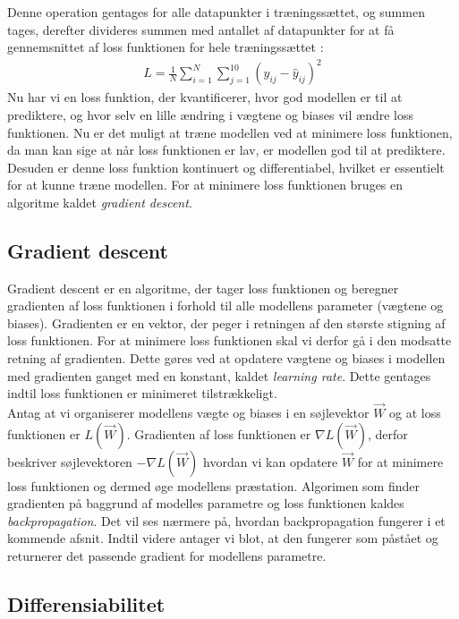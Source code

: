 \documentclass{article}
\begin{document}
Denne operation gentages for alle datapunkter i træningssættet, og summen tages, derefter divideres summen med antallet af datapunkter for at få gennemsnittet af loss funktionen for hele træningssættet \parencite{Sanderson_2017}:
\begin{align}
  L = \frac{1}{N} \sum_{i=1}^{N} \sum_{j=1}^{10} (y_{ij} - \hat{y}_{ij})^2
\end{align}
Nu har vi en loss funktion, der kvantificerer, hvor god modellen er til at prediktere, og hvor selv en lille ændring i vægtene og biases vil ændre loss funktionen. Nu er det muligt at træne modellen ved at minimere loss funktionen, da man kan sige at når loss funktionen er lav, er modellen god til at prediktere. Desuden er denne loss funktion kontinuert og differentiabel, hvilket er essentielt for at kunne træne modellen. For at minimere loss funktionen bruges en algoritme kaldet \textit{gradient descent}. 

\subsection{Gradient descent}
Gradient descent er en algoritme, der tager loss funktionen og beregner gradienten af loss funktionen i forhold til alle modellens parameter (vægtene og biases). Gradienten er en vektor, der peger i retningen af den største stigning af loss funktionen. For at minimere loss funktionen skal vi derfor gå i den modsatte retning af gradienten. Dette gøres ved at opdatere vægtene og biases i modellen med gradienten ganget med en konstant, kaldet \textit{learning rate}. Dette gentages indtil loss funktionen er minimeret tilstrækkeligt. \parencite{IBM_2021,Sanderson_2017,Nielsen_2019a}\\
Antag at vi organiserer modellens vægte og biases i en søjlevektor $\vec{W}$ og at loss funktionen er $L(\vec{W})$. Gradienten af loss funktionen er $\nabla L(\vec{W})$, derfor beskriver søjlevektoren $-\nabla L(\vec{W})$ hvordan vi kan opdatere $\vec{W}$ for at minimere loss funktionen og dermed øge modellens præstation. Algorimen som finder gradienten på baggrund af modelles parametre og loss funktionen kaldes \textit{backpropagation}. \parencite{Sanderson_2017,Nielsen_2019a} Det vil ses nærmere på, hvordan backpropagation fungerer i et kommende afsnit. Indtil videre antager vi blot, at den fungerer som påstået og returnerer det passende gradient for modellens parametre.

\subsection{Differensiabilitet}

\newpage
\printbibliography
\end{document}
